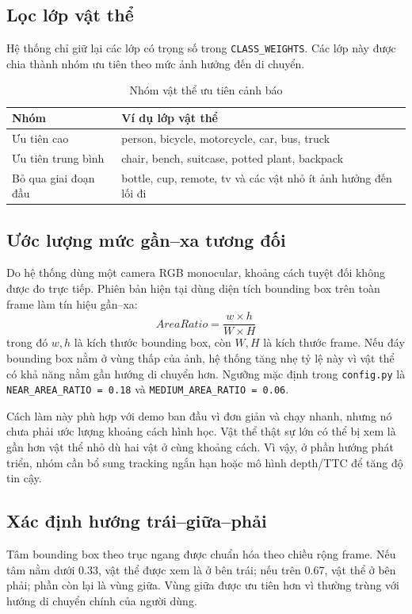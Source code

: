 \documentclass[oneside,final]{hcmut-report}
\begin{document}
\subsection{Lọc lớp vật thể}
Hệ thống chỉ giữ lại các lớp có trọng số trong \texttt{CLASS\_WEIGHTS}. Các lớp này được chia thành nhóm ưu tiên theo mức ảnh hưởng đến di chuyển.

\begin{table}[H]
  \centering
  \caption{Nhóm vật thể ưu tiên cảnh báo}
  \label{tab:class-priority}
  \begin{tabularx}{\textwidth}{L{3.4cm}Y}
    \toprule
    \textbf{Nhóm} & \textbf{Ví dụ lớp vật thể} \\
    \midrule
    Ưu tiên cao & person, bicycle, motorcycle, car, bus, truck \\
    Ưu tiên trung bình & chair, bench, suitcase, potted plant, backpack \\
    Bỏ qua giai đoạn đầu & bottle, cup, remote, tv và các vật nhỏ ít ảnh hưởng đến lối đi \\
    \bottomrule
  \end{tabularx}
\end{table}

\subsection{Ước lượng mức gần--xa tương đối}
Do hệ thống dùng một camera RGB monocular, khoảng cách tuyệt đối không được đo trực tiếp. Phiên bản hiện tại dùng diện tích bounding box trên toàn frame làm tín hiệu gần--xa:
\[
AreaRatio = \frac{w \times h}{W \times H}
\]
trong đó $w, h$ là kích thước bounding box, còn $W, H$ là kích thước frame. Nếu đáy bounding box nằm ở vùng thấp của ảnh, hệ thống tăng nhẹ tỷ lệ này vì vật thể có khả năng nằm gần hướng di chuyển hơn. Ngưỡng mặc định trong \texttt{config.py} là \texttt{NEAR\_AREA\_RATIO = 0.18} và \texttt{MEDIUM\_AREA\_RATIO = 0.06}.

Cách làm này phù hợp với demo ban đầu vì đơn giản và chạy nhanh, nhưng nó chưa phải ước lượng khoảng cách hình học. Vật thể thật sự lớn có thể bị xem là gần hơn vật thể nhỏ dù hai vật ở cùng khoảng cách. Vì vậy, ở phần hướng phát triển, nhóm cần bổ sung tracking ngắn hạn hoặc mô hình depth/TTC để tăng độ tin cậy.

\subsection{Xác định hướng trái--giữa--phải}
Tâm bounding box theo trục ngang được chuẩn hóa theo chiều rộng frame. Nếu tâm nằm dưới 0.33, vật thể được xem là ở bên trái; nếu trên 0.67, vật thể ở bên phải; phần còn lại là vùng giữa. Vùng giữa được ưu tiên hơn vì thường trùng với hướng di chuyển chính của người dùng.
\end{document}

